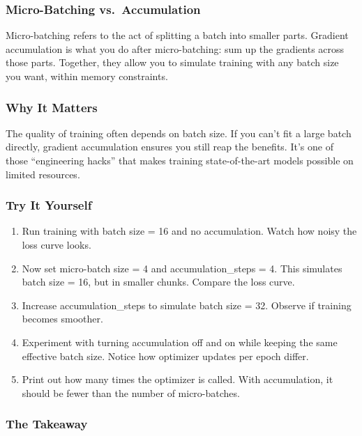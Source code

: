 \documentclass[
  letterpaper,
  DIV=11,
  numbers=noendperiod]{scrreprt}
\providecommand{\tightlist}{%
  \setlength{\itemsep}{0pt}\setlength{\parskip}{0pt}}
\begin{document}
\subsubsection{Micro-Batching
vs.~Accumulation}\label{micro-batching-vs.-accumulation}

Micro-batching refers to the act of splitting a batch into smaller
parts. Gradient accumulation is what you do after micro-batching: sum up
the gradients across those parts. Together, they allow you to simulate
training with any batch size you want, within memory constraints.

\subsubsection{Why It Matters}\label{why-it-matters-27}

The quality of training often depends on batch size. If you can't fit a
large batch directly, gradient accumulation ensures you still reap the
benefits. It's one of those ``engineering hacks'' that makes training
state-of-the-art models possible on limited resources.

\subsubsection{Try It Yourself}\label{try-it-yourself-32}

\begin{enumerate}
\def\labelenumi{\arabic{enumi}.}
\tightlist
\item
  Run training with batch size = 16 and no accumulation. Watch how noisy
  the loss curve looks.
\item
  Now set micro-batch size = 4 and accumulation\_steps = 4. This
  simulates batch size = 16, but in smaller chunks. Compare the loss
  curve.
\item
  Increase accumulation\_steps to simulate batch size = 32. Observe if
  training becomes smoother.
\item
  Experiment with turning accumulation off and on while keeping the same
  effective batch size. Notice how optimizer updates per epoch differ.
\item
  Print out how many times the optimizer is called. With accumulation,
  it should be fewer than the number of micro-batches.
\end{enumerate}

\subsubsection{The Takeaway}\label{the-takeaway-33}
\end{document}
